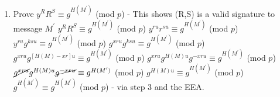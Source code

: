 \documentclass{assignment}
\begin{document}
\begin{problemlist}
\begin{problem}
\begin{enumerate}
\begin{enumerate}
\item
Prove $y^RR^S \equiv g^{H(M^{\prime})}$ (mod $p$) - This shows (R,S) is a valid signature to message $M^{\prime}$ \newline
$y^RR^S \equiv g^{H(M^{\prime})}$ (mod $p$) \newline
$y^{ru}r^{su} \equiv g^{H(M^{\prime})}$ (mod $p$) \newline
$y^{ru}g^{ksu} \equiv g^{H(M^{\prime})}$ (mod $p$) \newline
$g^{xru}g^{ksu} \equiv g^{H(M^{\prime})}$ (mod $p$) \newline
$g^{xru}g^{[H(M) - xr]u} \equiv g^{H(M^{\prime})}$ (mod $p$) \newline
$g^{xru}g^{H(M)u} g^{-xru} \equiv g^{H(M^{\prime})}$ (mod $p$) \newline
$\cancel{g^{xru}}g^{H(M)u} \cancel{g^{-xru}} \equiv g^{H(M^{\prime})}$ (mod $p$) \newline
$g^{H(M)u} \equiv g^{H(M^{\prime})}$ (mod $p$) \newline
$g^{H(M^{\prime})} \equiv g^{H(M^{\prime})}$ (mod $p$) - via step 3 and the EEA. \newline





\end{enumerate}
\end{enumerate}
\end{problem}

\end{problemlist}
\end{document}
